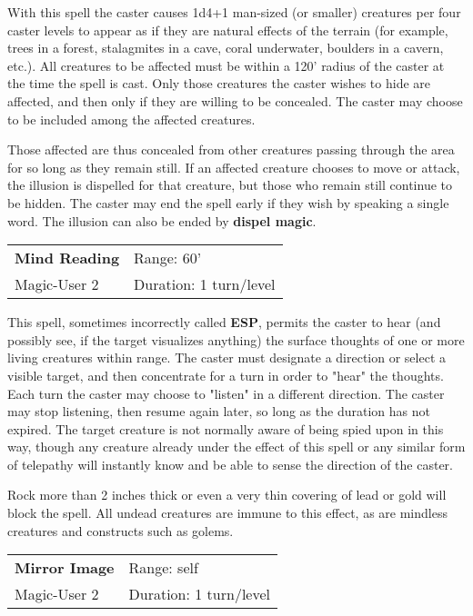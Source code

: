 \documentclass[a4paper,twoside,openany,10pt]{book}
\begin{document}
\begin{multicols}{2}
With this spell the caster causes 1d4+1 man-sized (or smaller) creatures per four caster levels to appear as if they are natural effects of the terrain (for example, trees in a forest, stalagmites in a cave, coral underwater, boulders in a cavern, etc.). All creatures to be affected must be within a 120' radius of the caster at the time the spell is cast. Only those creatures the caster wishes to hide are affected, and then only if they are willing to be concealed. The caster may choose to be included among the affected creatures.

Those affected are thus concealed from other creatures passing through the area for so long as they remain still. If an affected creature chooses to move or attack, the illusion is dispelled for that creature, but those who remain still continue to be hidden. The caster may end the spell early if they wish by speaking a single word. The illusion can also be ended by \textbf{dispel magic}.


\smallskip\begin{flushleft} 
	\begin{tabularx}{0.45\textwidth}{@{}m{3.5cm}m{5.5cm}@{}} 
		\textbf{Mind Reading} & Range: 60'\\
Magic-User 2 & Duration: 1 turn/level\\
	\end{tabularx}\end{flushleft}


This spell, sometimes incorrectly called \textbf{ESP}, permits the caster to hear (and possibly see, if the target visualizes anything) the surface thoughts of one or more living creatures within range. The caster must designate a direction or select a visible target, and then concentrate for a turn in order to "hear" the thoughts. Each turn the caster may choose to "listen" in a different direction. The caster may stop listening, then resume again later, so long as the duration has not expired. The target creature is not normally aware of being spied upon in this way, though any creature already under the effect of this spell or any similar form of telepathy will instantly know and be able to sense the direction of the caster.

Rock more than 2 inches thick or even a very thin covering of lead or gold will block the spell. All undead creatures are immune to this effect, as are mindless creatures and constructs such as golems.


\smallskip\begin{flushleft} 
	\begin{tabularx}{0.45\textwidth}{@{}m{3.5cm}m{5.5cm}@{}} 
		\textbf{Mirror Image} & Range: self\\
		Magic-User 2 & Duration: 1 turn/level\\
	\end{tabularx}\end{flushleft}


\end{multicols}
\end{document}
